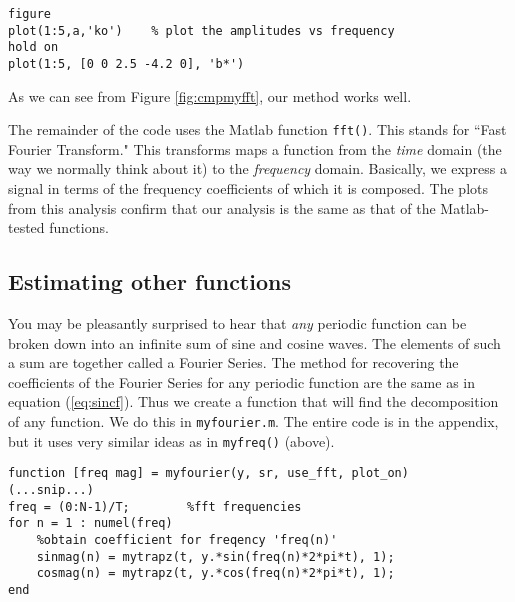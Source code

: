 \documentclass{article}
\begin{document}
\begin{verbatim}
figure
plot(1:5,a,'ko')    % plot the amplitudes vs frequency
hold on
plot(1:5, [0 0 2.5 -4.2 0], 'b*')
\end{verbatim}


 As we can see from Figure \ref{fig:cmpmyfft}, our method works well.

The remainder of the code uses the Matlab function {\tt fft()}. This stands for ``Fast Fourier Transform."  This transforms maps a function from the {\it time} domain (the way we normally think about it) to the {\it frequency} domain.  Basically, we express a signal in terms of the frequency coefficients of which it is composed.  The plots from this analysis confirm that our analysis is the same as that of the Matlab-tested functions.


\subsection{Estimating other functions}
You may be pleasantly surprised to hear that {\it any} periodic function can be broken down into an infinite sum of sine and cosine waves.  The elements of such a sum are together called a Fourier Series.  The method for recovering the coefficients of the Fourier Series for any periodic function are the same as in equation (\ref{eq:sincf}).  Thus we create a function that will find the decomposition of any function.  We do this in {\tt myfourier.m}.  The entire code is in the appendix, but it uses very similar ideas as in {\tt myfreq()} (above).

\begin{verbatim}
function [freq mag] = myfourier(y, sr, use_fft, plot_on)
(...snip...)
freq = (0:N-1)/T;        %fft frequencies
for n = 1 : numel(freq)
    %obtain coefficient for freqency 'freq(n)'
    sinmag(n) = mytrapz(t, y.*sin(freq(n)*2*pi*t), 1);
    cosmag(n) = mytrapz(t, y.*cos(freq(n)*2*pi*t), 1);
end

\end{verbatim}
\end{document}
